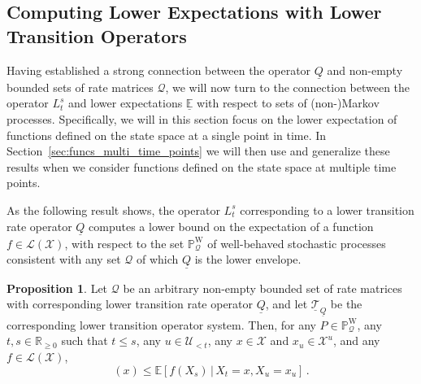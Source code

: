 \documentclass[10pt,a4paper]{paper}
\theoremstyle{definition}
\newtheorem{proposition}[theorem]{Proposition}
\newcommand{\reals}{\mathbb{R}}
\newcommand{\realsnonneg}{\reals_{\geq 0}}
\newcommand{\states}{\mathcal{X}}
\newcommand{\processes}{\mathbb{P}}
\newcommand{\wprocesses}{\processes^{\mathrm{W}}}
\newcommand{\gambles}{\mathcal{L}}
\newcommand{\gamblesX}{\gambles(\states)}
\newcommand{\rateset}{\mathcal{Q}}
\newcommand{\lrate}{\underline{Q}}
\begin{document}



\subsection{Computing Lower Expectations with Lower Transition Operators}\label{sec:single_var_lower_exp}

Having established a strong connection between the operator $\lrate$ and non-empty bounded sets of rate matrices $\rateset$, we will now turn to the connection between the operator $L_t^s$ and lower expectations $\underline{\mathbb{E}}$ with respect to sets of (non-)Markov processes. Specifically, we will in this section focus on the lower expectation of functions defined on the state space at a single point in time. In Section~\ref{sec:funcs_multi_time_points} we will then use and generalize these results when we consider functions defined on the state space at multiple time points.

As the following result shows, the operator $L_t^s$ corresponding to a lower transition rate operator $\lrate$ computes a lower bound on the expectation of a function $f\in\gamblesX$, with respect to the set $\wprocesses_\rateset$ of well-behaved stochastic processes consistent with any set $\rateset$ of which $\lrate$ is the lower envelope.

\begin{proposition}\label{theorem:nonmarkov_single_var_lower_bounded}
Let $\rateset$ be an arbitrary non-empty bounded set of rate matrices with corresponding lower transition rate operator $\lrate$, and let $\underline{\mathcal{T}}_{\lrate}$ be the corresponding lower transition operator system. Then, for any $P\in\wprocesses_\rateset$, any $t,s\in\realsnonneg$ such that $t\leq s$, any $u\in\mathcal{U}_{<t}$, any $x\in\states$ and $x_u\in\states^u$, and any $f\in\gamblesX$,
\begin{equation*}
[L_{t}^s f](x) \leq \mathbb{E}[f(X_s)\,\vert\,X_t=x,X_u=x_u]\,.
\end{equation*}
\end{proposition}
\end{document}
